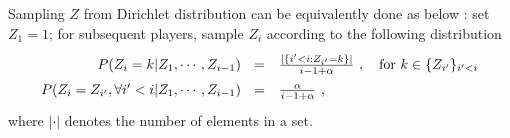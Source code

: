 Sampling $Z$ from Dirichlet distribution can be equivalently done as below \cite{neal2000markov}: 
set $Z_1 = 1$; for subsequent players, sample $Z_i$ according to  the following distribution 
\begin{equation*}
\label{eq:condition}
\renewcommand*{\arraystretch}{1.5}
\begin{array}{rl}
    P(Z_i = k | Z_1, \cdots, Z_{i-1}) 
~~=& \frac{|\{i' < i : Z_{i'} = k\}|}{i-1 + \alpha}  ~, \quad \text{for } k \in \{Z_{i'}\}_{i' < i}  \\
   P(Z_i = Z_{i'}, \forall i' < i | Z_1, \cdots, Z_{i-1}) 
~~=& \frac{\alpha}{i-1 + \alpha} ~,
\end{array}
\end{equation*}
where $|\cdot|$ denotes the number of elements in a set.

